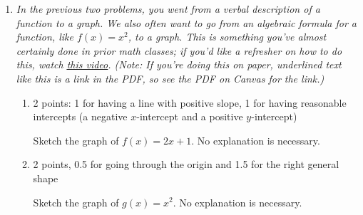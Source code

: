 \documentclass{article}
\makeatletter
\let\@href=\href
\renewcommand{\href}[2]{\@href{#1}{\ul{#2}}}
\makeatother
\begin{document}
\begin{enumerate}
\begin{enumerate}
  \end{enumerate}

  \pspace{\newpage}

\item 

  \emph{In the previous two problems, you went from a verbal description of a function to a graph. We also often want to go from an algebraic formula for a function, like $f(x) = x^2$, to a graph. This is something you've almost certainly done in prior math classes; if you'd like a refresher on how to do this, watch \href{https://www.youtube.com/watch?v=2-dUHLHeyTY}{this video}. (Note: If you're doing this on paper, underlined text like this is a link in the PDF, so see the PDF on Canvas for the link.)}

  \begin{enumerate}
  \item

    \begin{grading}
      2 points: 1 for having a line with positive slope, 1 for having reasonable intercepts (a negative $x$-intercept and a positive $y$-intercept)
    \end{grading}

    \begin{problem}[\vfill]
      Sketch the graph of $f(x) = 2x + 1$. No explanation is necessary. 
    \end{problem}

    \begin{solution}
      \begin{center}
      \end{center}
    \end{solution}

  \item

    \begin{grading}
      2 points, 0.5 for going through the origin and 1.5 for the right
      general shape 
    \end{grading}

    \begin{problem}[\vfill]
      Sketch the graph of $g(x) = x^2$. No explanation is necessary. 
    \end{problem}


\end{enumerate}
\end{enumerate}
\end{document}
